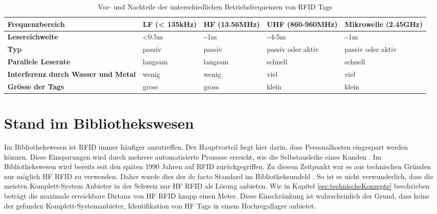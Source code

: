 \begin{table}[htb]
	\begin{tabularx}{\textwidth}{|X|X|X|X|X|}
		\hline
		\textbf{Frequenz\-bereich} & \textbf{LF (< 135kHz)} & \textbf{\gls{HF} (13.56MHz)} & \textbf{\gls{UHF} (860-960MHz)} & \textbf{Mikrowelle (2.45GHz)}\\
		\hline
		\textbf{Lesereichweite} & <0.5m & \textasciitilde 1m & \textasciitilde 4-5m & \textasciitilde 1m\\
		\hline
		\textbf{Typ} & passiv & passiv & passiv oder aktiv & passiv oder aktiv\\
		\hline
		\textbf{Parallele Leserate} & langsam & langsam & schnell & schnell \\
		\hline
		\textbf{Interferenz durch Wasser und Metal} & wenig & wenig & viel & viel \\
		\hline
		\textbf{Grösse der Tags} & gross & gross & klein & klein \\
		\hline
	\end{tabularx}
	\caption{Vor- und Nachteile der unterschiedlichen Betriebsfrequenzen von \gls{RFID} Tags \parencite{chawla2007}}
	\label{tbl:RFIDFrequencies}
\end{table}

\section{Stand im Bibliothekswesen}
Im Bibliothekswesen ist \gls{RFID} immer häufiger anzutreffen. Der Hauptvorteil liegt hier darin, dass Personalkosten eingespart werden können. Diese Einsparungen wird durch mehrere automatisierte Prozesse erreicht, wie die Selbstausleihe eines Kunden \parencite{Keller2010}.
Im Bibliothekswesen wird bereits seit den späten 1990 Jahren auf \gls{RFID} zurückgegriffen. Zu diesem Zeitpunkt war es aus technischen Gründen nur möglich \gls{HF} \gls{RFID} zu verwenden. Daher wurde dies der de facto Standard im Bibliotheksumfeld \parencite{rfidHfVsUhf}. So ist es nicht verwunderlich, dass die meisten Komplett-System Anbieter in der Schweiz nur \gls{HF} \gls{RFID} als Lösung anbieten. Wie in Kapitel \ref{sec:technischeKonzepte} beschrieben beträgt die maximale erreichbare Distanz von \gls{HF} \gls{RFID} knapp einen Meter. Diese Einschränkung ist wahrscheinlich der Grund, dass keine der gefunden Komplett-Systemanbieter, Identifikation von \gls{HF} Tags in einem Hochregallager anbietet.


